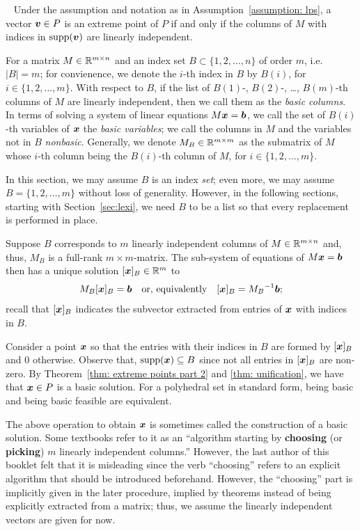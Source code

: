 ~ Under the assumption and notation as in Assumption~\ref{assumption: lps}, a vector ${\boldsymbol v} \in P$ is an extreme point of $P$ if and only if the columns of $M$ with indices in $\operatorname{supp}({\boldsymbol v})$ are linearly independent.

For a matrix $M \in \mathbb R^{m\times n}$ and an index set $B\subset \{1, 2, \dots, n\}$ of order $m$, i.e. $|B| = m$; for convienence, we denote the $i$-th index in $B$ by $B(i)$, for $i\in\{1, 2, \dots, m\}$.  With respect to $B$, if the list of $B(1)$-, $B(2)$-, \dots, $B(m)$-th columns of $M$ are linearly independent, then we call them as the {\em basic columns}. In terms of solving a system of linear equations $ M {\boldsymbol x} = {\boldsymbol b}$, we call the set of $B(i)$-th variables of ${\boldsymbol x}$ the {\em basic variables}; we call the columns in $M$ and the variables not in $B$ {\em nonbasic}. Generally, we denote $M_B\in\mathbb R^{m\times m}$ as the submatrix of $M$ whose $i$-th column being the $B(i)$-th column of $M$, for $i\in\{1, 2, \dots, m\}$. 

\begin{remark}\label{rmk:Replacement}
In this section, we may assume $B$ is an index {\em set}; even more, we may assume $B = \{1, 2, \dots, m\}$ without loss of generality. However, in the following sections, starting with Section~\ref{sec:lexi}, we need $B$ to be a list so that every replacement is performed in place. 
\end{remark}

Suppose $B$ corresponds to $m$ linearly independent columns of $M\in\mathbb R^{m\times n}$ and, thus, $M_B$ is a full-rank $m\times m$-matrix. The sub-system of equations of $M{\boldsymbol x} = {\boldsymbol b}$ then has a unique solution $[{\boldsymbol x}]_B \in \mathbb R^m$ to 
\[ M_B [{\boldsymbol x}]_B =  {\boldsymbol b}  \quad\text{or, equivalently}\quad  [{\boldsymbol x}]_B = {M_B}^{-1}{\boldsymbol b}; \]
recall that $[{\boldsymbol x}]_B$ indicates the subvector extracted from entries of ${\boldsymbol x}$ with indices in $B$. 

Consider a point ${\boldsymbol x}$ so that the entries with their indices in $B$ are formed by $[{\boldsymbol x}]_B$ and 0 otherwise. Observe that, $\operatorname{supp}({\boldsymbol x})\subseteq B$ since not all entries in $[{\boldsymbol x}]_B$ are non-zero. By Theorem~\ref{thm: extreme points part 2} and \ref{thm: unification}, we have that ${\boldsymbol x} \in P$ is a basic solution. For a polyhedral set in standard form, being basic and being basic feasible are equivalent. 

\begin{remark}
The above operation to obtain ${\boldsymbol x}$ is sometimes called the construction of a basic solution. Some textbooks refer to it as an ``algorithm starting by {\bf choosing} (or {\bf picking}) $m$ linearly independent columns.'' However, the last author of this booklet felt that it is misleading since the verb ``choosing'' refers to an explicit algorithm that should be introduced beforehand. However, the ``choosing'' part is implicitly given in the later procedure, implied by theorems instead of being explicitly extracted from a matrix; thus, we assume the linearly independent vectors are given for now. 
\end{remark}



